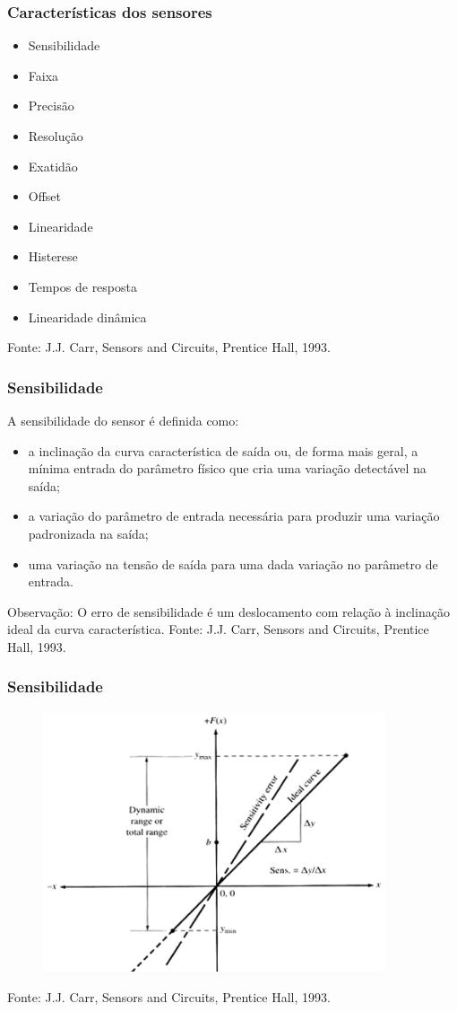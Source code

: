 \documentclass{beamer}
\begin{document}
\begin{frame}
	\frametitle{Características dos sensores}
	\begin{itemize}
		\item Sensibilidade
		\item Faixa
		\item Precisão
		\item Resolução
		\item Exatidão
		\item Offset
		\item Linearidade
		\item Histerese
		\item Tempos de resposta
		\item Linearidade dinâmica
	\end{itemize}
	{\scriptsize Fonte: J.J. Carr, Sensors and Circuits, Prentice Hall, 1993.}
\end{frame}

\begin{frame}
	\frametitle{Sensibilidade}
	A sensibilidade do sensor é definida como:
	 \begin{itemize}
	 	\item a inclinação da curva característica de saída ou, de forma mais geral, a mínima entrada do parâmetro físico que cria uma variação detectável na saída;
	 	\item a variação do parâmetro de entrada necessária para produzir uma variação padronizada na saída;
	 	\item uma variação na tensão de saída para uma dada variação no parâmetro de entrada.
	 \end{itemize}	
 	 Observação: O erro de sensibilidade é um deslocamento com relação à inclinação ideal da curva característica.
	{\scriptsize Fonte: J.J. Carr, Sensors and Circuits, Prentice Hall, 1993.}
\end{frame}

\begin{frame}
	\frametitle{Sensibilidade}
	\begin{figure}
		\includegraphics[width=0.9\textwidth]{sensibilidade}
	\end{figure}
	{\scriptsize Fonte: J.J. Carr, Sensors and Circuits, Prentice Hall, 1993.}
\end{frame}
\end{document}
